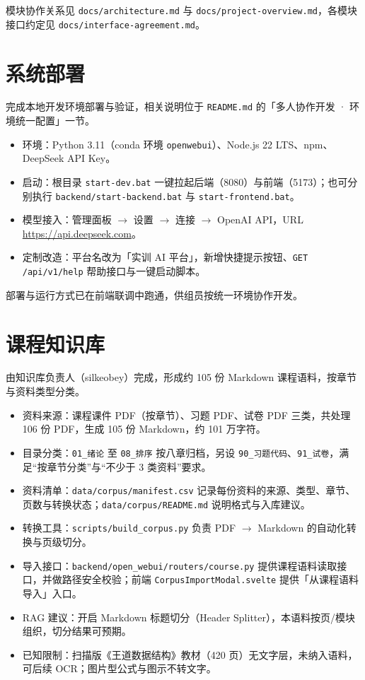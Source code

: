 \documentclass[12pt,a4paper]{ctexart}
\begin{document}
模块协作关系见 \texttt{docs/architecture.md} 与 \texttt{docs/project-overview.md}，各模块接口约定见 \texttt{docs/interface-agreement.md}。

\section{系统部署}

完成本地开发环境部署与验证，相关说明位于 \texttt{README.md} 的「多人协作开发 · 环境统一配置」一节。

\begin{itemize}
  \item 环境：Python 3.11（conda 环境 \texttt{openwebui}）、Node.js 22 LTS、npm、DeepSeek API Key。
  \item 启动：根目录 \texttt{start-dev.bat} 一键拉起后端（8080）与前端（5173）；也可分别执行 \texttt{backend/start-backend.bat} 与 \texttt{start-frontend.bat}。
  \item 模型接入：管理面板 $\rightarrow$ 设置 $\rightarrow$ 连接 $\rightarrow$ OpenAI API，URL \url{https://api.deepseek.com}。
  \item 定制改造：平台名改为「实训 AI 平台」，新增快捷提示按钮、\texttt{GET /api/v1/help} 帮助接口与一键启动脚本。
\end{itemize}

部署与运行方式已在前端联调中跑通，供组员按统一环境协作开发。

\section{课程知识库}

由知识库负责人（silkeobey）完成，形成约 105 份 Markdown 课程语料，按章节与资料类型分类。

\begin{itemize}
  \item 资料来源：课程课件 PDF（按章节）、习题 PDF、试卷 PDF 三类，共处理 106 份 PDF，生成 105 份 Markdown，约 101 万字符。
  \item 目录分类：\texttt{01\_绪论} 至 \texttt{08\_排序} 按八章归档，另设 \texttt{90\_习题代码}、\texttt{91\_试卷}，满足“按章节分类”与“不少于 3 类资料”要求。
  \item 资料清单：\texttt{data/corpus/manifest.csv} 记录每份资料的来源、类型、章节、页数与转换状态；\texttt{data/corpus/README.md} 说明格式与入库建议。
  \item 转换工具：\texttt{scripts/build\_corpus.py} 负责 PDF $\rightarrow$ Markdown 的自动化转换与页级切分。
  \item 导入接口：\texttt{backend/open\_webui/routers/course.py} 提供课程语料读取接口，并做路径安全校验；前端 \texttt{CorpusImportModal.svelte} 提供「从课程语料导入」入口。
  \item RAG 建议：开启 Markdown 标题切分（Header Splitter），本语料按页/模块组织，切分结果可预期。
  \item 已知限制：扫描版《王道数据结构》教材（420 页）无文字层，未纳入语料，可后续 OCR；图片型公式与图示不转文字。
\end{itemize}
\end{document}
